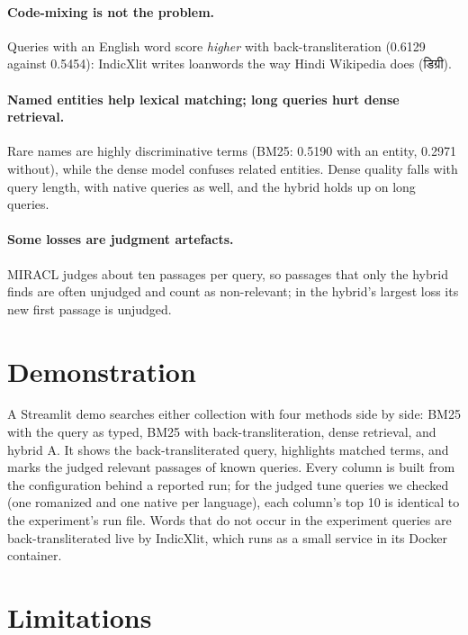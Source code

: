 \documentclass[11pt,a4paper]{article}
\newcommand{\dev}[1]{{\devfont #1}}
\begin{document}
\paragraph{Code-mixing is not the problem.} Queries with an English word score \emph{higher}
with back-transliteration (0.6129 against 0.5454): IndicXlit writes loanwords the way Hindi
Wikipedia does (\dev{डिग्री}).

\paragraph{Named entities help lexical matching; long queries hurt dense retrieval.} Rare
names are highly discriminative terms (BM25: 0.5190 with an entity, 0.2971 without), while
the dense model confuses related entities. Dense quality falls with query length, with native
queries as well, and the hybrid holds up on long queries.

\paragraph{Some losses are judgment artefacts.} MIRACL judges about ten passages per query,
so passages that only the hybrid finds are often unjudged and count as non-relevant; in the
hybrid's largest loss its new first passage is unjudged.

\section{Demonstration}

A Streamlit demo searches either collection with four methods side by side: BM25 with the
query as typed, BM25 with back-transliteration, dense retrieval, and hybrid A. It shows the
back-transliterated query, highlights matched terms, and marks the judged relevant passages
of known queries. Every column is built from the configuration behind a reported run; for the
judged tune queries we checked (one romanized and one native per language), each column's top
10 is identical to the experiment's run file. Words
that do not occur in the experiment queries are back-transliterated live by IndicXlit, which
runs as a small service in its Docker container.

\section{Limitations}
\end{document}

